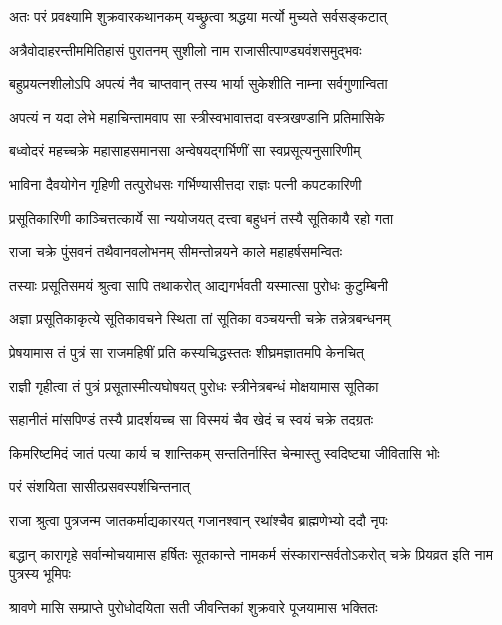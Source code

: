 
\twolineshloka
{अतः परं प्रवक्ष्यामि शुक्रवारकथानकम्}
{यच्छ्रुत्वा श्रद्धया मर्त्यो मुच्यते सर्वसङ्कटात्} %

\twolineshloka
{अत्रैवोदाहरन्तीममितिहासं पुरातनम्}
{सुशीलो नाम राजासीत्पाण्ड्यवंशसमुद्भवः} %

\twolineshloka
{बहुप्रयत्नशीलोऽपि अपत्यं नैव चाप्तवान्}
{तस्य भार्या सुकेशीति नाम्ना सर्वगुणान्विता} %

\twolineshloka
{अपत्यं न यदा लेभे महाचिन्तामवाप सा}
{स्त्रीस्वभावात्तदा वस्त्रखण्डानि प्रतिमासिके} %

\twolineshloka
{बध्वोदरं महच्चक्रे महासाहसमानसा}
{अन्वेषयद्गर्भिणीं सा स्वप्रसूत्यनुसारिणीम्} %

\twolineshloka
{भाविना दैवयोगेन गृहिणी तत्पुरोधसः}
{गर्भिण्यासीत्तदा राज्ञः पत्नी कपटकारिणी} %

\twolineshloka
{प्रसूतिकारिणी काञ्चित्तत्कार्ये सा न्ययोजयत्}
{दत्त्वा बहुधनं तस्यै सूतिकायै रहो गता} %

\twolineshloka
{राजा चक्रे पुंसवनं तथैवानवलोभनम्}
{सीमन्तोन्नयने काले महाहर्षसमन्वितः} %

\twolineshloka
{तस्याः प्रसूतिसमयं श्रुत्वा सापि तथाकरोत्}
{आद्यगर्भवती यस्मात्सा पुरोधः कुटुम्बिनी} %

\twolineshloka
{अज्ञा प्रसूतिकाकृत्ये सूतिकावचने स्थिता}
{तां सूतिका वञ्चयन्ती चक्रे तन्नेत्रबन्धनम्} %

\twolineshloka
{प्रेषयामास तं पुत्रं सा राजमहिषीं प्रति}
{कस्यचिद्धस्ततः शीघ्रमज्ञातमपि केनचित्} %

\twolineshloka
{राज्ञी गृहीत्वा तं पुत्रं प्रसूतास्मीत्यघोषयत्}
{पुरोधः स्त्रीनेत्रबन्धं मोक्षयामास सूतिका} %

\twolineshloka
{सहानीतं मांसपिण्डं तस्यै प्रादर्शयच्च सा}
{विस्मयं चैव खेदं च स्वयं चक्रे तदग्रतः} %

\twolineshloka
{किमरिष्टमिदं जातं पत्या कार्य च शान्तिकम्}
{सन्ततिर्नास्ति चेन्मास्तु स्वदिष्ट्या जीवितासि भोः} %

\onelineshloka
{परं संशयिता सासीत्प्रसवस्पर्शचिन्तनात्} %


\twolineshloka
{राजा श्रुत्वा पुत्रजन्म जातकर्माद्यकारयत्}
{गजानश्वान् रथांश्चैव ब्राह्मणेभ्यो ददौ नृपः} %


\threelineshloka
{बद्धान् कारागृहे सर्वान्मोचयामास हर्षितः}
{सूतकान्ते नामकर्म संस्कारान्सर्वतोऽकरोत्}
{चक्रे प्रियव्रत इति नाम पुत्रस्य भूमिपः} %

\twolineshloka
{श्रावणे मासि सम्प्राप्ते पुरोधोदयिता सती}
{जीवन्तिकां शुक्रवारे पूजयामास भक्तितः} %

